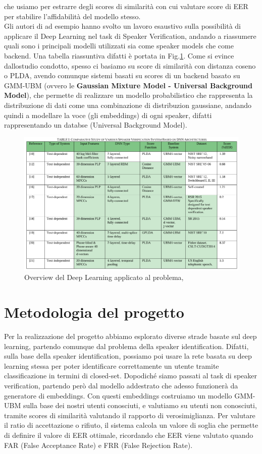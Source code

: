 che usiamo per estrarre degli scores di similarità con cui valutare score di EER per stabilire l'affidabilità del modello stesso. \\
Gli autori di \cite{irum2019speaker} ad esempio hanno svolto un lavoro esaustivo sulla possibilità di applicare il Deep Learning nel task di Speaker Verification,
andando a riassumere quali sono i principali modelli utilizzati sia come speaker models che come backend. Una tabella riassuntiva difatti è portata in Fig.\ref{fig:studiopaper}.
Come si evince dallostudio condotto, spesso ci basiamo su score di similarità con distanza coseno o PLDA, avendo comunque sistemi basati su scores di un backend basato su
GMM-UBM (ovvero le \textbf{Gaussian Mixture Model - Universal Background Model}), che permette di realizzare un modello probabilistico che rappresenta la distribuzione di dati
come una combinazione di distribuzion gaussiane, andando quindi a modellare la voce (gli embeddings) di ogni speaker, difatti rappresentando un databse (Universal Background Model). 
\begin{figure}[ht]
    \centering
    \includegraphics[width=1.0\textwidth]{./ch3/studio.png}
    \caption{Overview del Deep Learning applicato al problema, \cite{irum2019speaker}}
    \label{fig:studiopaper}
\end{figure}

\section{Metodologia del progetto}
Per la realizzazione del progetto abbiamo esplorato diverse strade basate sul deep learning, partendo comunque dal problema della speaker identification. 
Difatti, sulla base della speaker identification, possiamo poi usare la rete basata su deep learning stessa per poter identificare correttamente 
un utente tramite classificazione in termini di closed-set. Dopodiché siamo passati al task di speaker verification, partendo però dal modello addestrato che adesso funzionerà
da generatore di embeddings. Con questi embeddings costruiamo un modello GMM-UBM sulla base dei nostri utenti conosciuti, e valutiamo su utenti non conosciuti,
tramite scores di similarità valutando il rapporto di verosimiglianza. Per valutare il ratio di accettazione o rifiuto, il sistema calcola un valore di soglia che permette di definire il valore di EER
ottimale, ricordando che EER viene valutato quando FAR (False Acceptance Rate) e FRR (False Rejection Rate). \\

